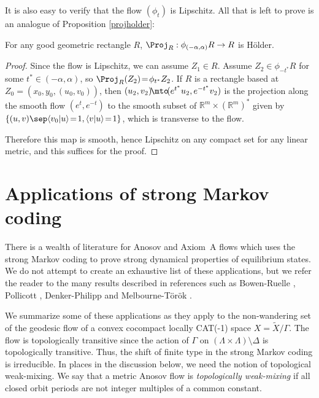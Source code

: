 It is also easy to verify that the flow $(\phi_t)$ is Lipschitz. All that is left to prove is an analogue of Proposition \ref{projholder}:

\begin{lem}
For any good geometric rectangle $R$, $\Proj_R:\phi_{(-\alpha,\alpha)} R \to R$ is Hölder.
\end{lem}

\begin{proof}
Since the flow is Lipschitz, we can assume $Z_1\!\in\! R$. Assume $Z_2 \!\in\! \phi_{-t^*}R$ for some $t^* \!\in\! (-\alpha, \alpha)$, so $\Proj_R(Z_2) \!=\! \phi_{t^*}Z_2$. If $R$ is a rectangle based at $Z_0\!=\!(x_0,y_0,(u_0,v_0))$, then $(u_2, v_2)\!\mto\! (e^{t^*}u_2, e^{-t^*}v_2)$ is the projection along the smooth flow $(e^t, e^{-t})$ to the smooth subset of $\mathbb{R}^m\!\times\! (\mathbb{R}^m)^*$ given by \hbox{$\{(u,v)\sep \langle v_0 | u \rangle \!=\!1, \langle v|u \rangle \!=\!1\}$}, which is transverse to the flow. \newpage

Therefore this map is smooth, hence Lipschitz on any compact set for any linear metric, and this suffices for the proof.
\end{proof}

\section{Applications of strong Markov coding}\label{s.applications}

There is a wealth of literature for Anosov and Axiom~A flows which uses the strong Markov coding to prove strong dynamical properties of equilibrium states. We do not attempt to create an exhaustive list of these applications, but we refer the reader to the many results described in references such as Bowen-Ruelle \cite{bowen-ruelle}, Pollicott \cite{pollicott}, Denker-Philipp \cite{DP84} and Melbourne-Török \cite{MT04}.

We summarize some of these applications as they apply to the non-wandering set of the geodesic flow of a convex cocompact locally CAT(-1) space $X = \tilde X/\Gamma$. The flow is topologically transitive since the action of $\Gamma$ on $(\Lambda \times \Lambda)\setminus \Delta$ is topologically transitive. Thus, the shift of finite type in the strong Markov coding is irreducible. In places in the discussion below, we need the notion of topological weak-mixing. We say that a metric Anosov flow is \emph{topologically weak-mixing} if all closed orbit periods are not integer multiples of a common constant.

